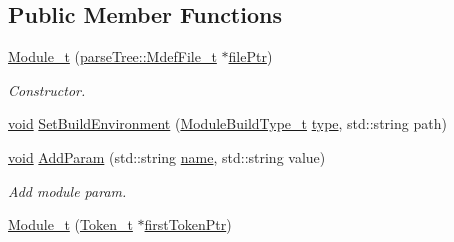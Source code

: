 \subsection*{Public Member Functions}
\begin{DoxyCompactItemize}
\item 
\hyperlink{struct_module__t_a8b887c65bbaa6ceb9b23e2f02babdc41}{Module\+\_\+t} (\hyperlink{structparse_tree_1_1_mdef_file__t}{parse\+Tree\+::\+Mdef\+File\+\_\+t} $\ast$\hyperlink{struct_content__t_a5a292ff88ad990d4dd6a04f10239d7a9}{file\+Ptr})
\begin{DoxyCompactList}\small\item\em Constructor. \end{DoxyCompactList}\item 
\hyperlink{_t_e_m_p_l_a_t_e__cdef_8h_ac9c84fa68bbad002983e35ce3663c686}{void} \hyperlink{struct_module__t_a2a53fa7067ca0599717306a58a46aa83}{Set\+Build\+Environment} (\hyperlink{struct_module__t_a889284dddd5ba67aa7bcf51040e49c7d}{Module\+Build\+Type\+\_\+t} \hyperlink{struct_content__t_a425ca8053dc9acd7555ea9fff664eb97}{type}, std\+::string path)
\item 
\hyperlink{_t_e_m_p_l_a_t_e__cdef_8h_ac9c84fa68bbad002983e35ce3663c686}{void} \hyperlink{struct_module__t_a401051507449c328bfc3b2b28d9408ba}{Add\+Param} (std\+::string \hyperlink{struct_module__t_ababb92d168b2607d249930f55659793f}{name}, std\+::string value)
\begin{DoxyCompactList}\small\item\em Add module param. \end{DoxyCompactList}\item 
\hyperlink{struct_module__t_a2be37dc7f9d33d7656ff340f205f285c}{Module\+\_\+t} (\hyperlink{struct_token__t}{Token\+\_\+t} $\ast$\hyperlink{struct_compound_item__t_a4d95dc788120f627e332491589d20c5c}{first\+Token\+Ptr})
\end{DoxyCompactItemize}
